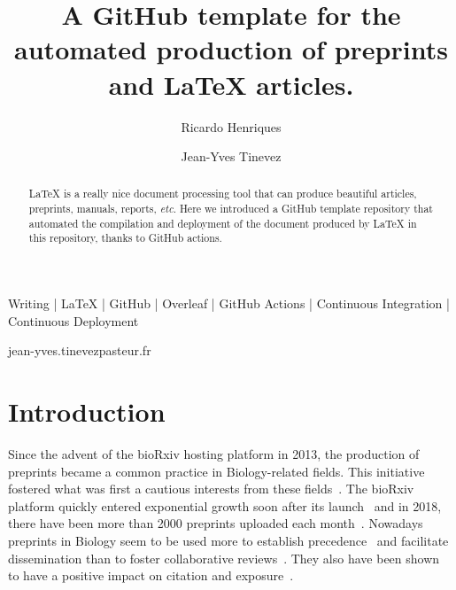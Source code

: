 
\title{A GitHub template for the automated production of preprints and LaTeX articles.}


\author[1\space\Letter]{Ricardo Henriques}
\author[2\space\Letter]{Jean-Yves Tinevez}


\maketitle

\begin{abstract} %

LaTeX is a really nice document processing tool that can produce beautiful articles, preprints, manuals, reports, \textit{etc}.
Here we introduced a GitHub template repository that automated the compilation and deployment of the document produced by LaTeX in this repository, thanks to GitHub actions.
\end{abstract}


\begin{keywords}
    Writing | LaTeX | GitHub | Overleaf | GitHub Actions | Continuous Integration | Continuous Deployment
\end{keywords}


\begin{corrauthor}
    jean-yves.tinevez\at pasteur.fr
\end{corrauthor}



\section*{Introduction}

Since the advent of the bioRxiv hosting platform in 2013, the production of preprints became a common practice in Biology-related fields.
This initiative fostered what was first a cautious interests from these fields~\cite{Callaway2012}.
The bioRxiv platform quickly entered exponential growth soon after its launch~\cite{Callaway2013} and in 2018, there have been more than 2000 preprints uploaded each month~\cite{Abdill2019}.
Nowadays preprints in Biology seem to be used more to establish precedence~\cite{Vale2016} and facilitate dissemination than to foster collaborative reviews~\cite{Anderson2020}.
They also have been shown to have a positive impact on citation and exposure~\cite{Abdill2019, Fraser2019}.

